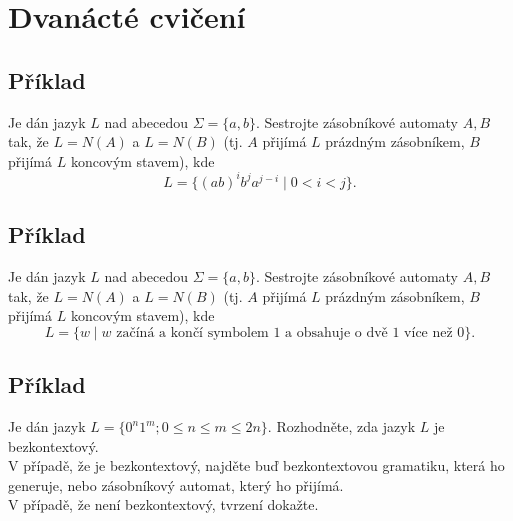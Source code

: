 \section{Dvanácté cvičení}

\subsection{Příklad}
Je dán jazyk $L$ nad abecedou $\Sigma = \{a,b\}$. Sestrojte zásobníkové automaty $A,B$ tak, že $L = N(A)$ a $L = N(B)$ (tj. $A$ přijímá $L$ prázdným zásobníkem, $B$ přijímá $L$ koncovým stavem), kde
\[L = \{(ab)^i b^j a^{j-i} \mid 0 < i < j\}\text{.}\]

\subsection{Příklad}
Je dán jazyk $L$ nad abecedou $\Sigma = \{a,b\}$. Sestrojte zásobníkové automaty $A,B$ tak, že $L = N(A)$ a $L = N(B)$ (tj. $A$ přijímá $L$ prázdným zásobníkem, $B$ přijímá $L$ koncovým stavem), kde
\[L = \{w \mid w \text{ začíná a končí symbolem } 1 \text{ a obsahuje o dvě } 1 \text{ více než } 0\}\text{.}\]

\subsection{Příklad}
Je dán jazyk $L = \{0^n 1^m; 0 \leq n \leq m \leq 2n\}$. Rozhodněte, zda jazyk $L$ je bezkontextový.\\
V případě, že je bezkontextový, najděte buď bezkontextovou gramatiku, která ho generuje, nebo zásobníkový automat, který ho přijímá.\\
V případě, že není bezkontextový, tvrzení dokažte.